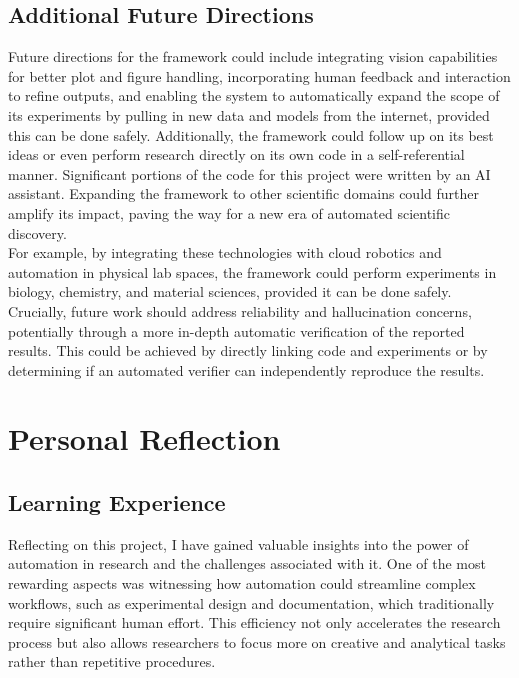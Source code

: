 \subsection{Additional Future Directions}    
    \begin{justify}    
        Future directions for the framework could include integrating vision capabilities for better plot and figure handling, incorporating human feedback and interaction to refine outputs, and enabling the system to automatically expand the scope of its experiments by pulling in new data and models from the internet, provided this can be done safely. Additionally, the framework could follow up on its best ideas or even perform research directly on its own code in a self-referential manner. Significant portions of the code for this project were written by an AI assistant. Expanding the framework to other scientific domains could further amplify its impact, paving the way for a new era of automated scientific discovery.\\
        For example, by integrating these technologies with cloud robotics and automation in physical lab spaces, the framework could perform experiments in biology, chemistry, and material sciences, provided it can be done safely. Crucially, future work should address reliability and hallucination concerns, potentially through a more in-depth automatic verification of the reported results. This could be achieved by directly linking code and experiments or by determining if an automated verifier can independently reproduce the results.
    \end{justify}

\section{Personal Reflection}
\subsection{Learning Experience}
Reflecting on this project, I have gained valuable insights into the power of automation in research and the challenges associated with it. One of the most rewarding aspects was witnessing how automation could streamline complex workflows, such as experimental design and documentation, which traditionally require significant human effort. This efficiency not only accelerates the research process but also allows researchers to focus more on creative and analytical tasks rather than repetitive procedures.

